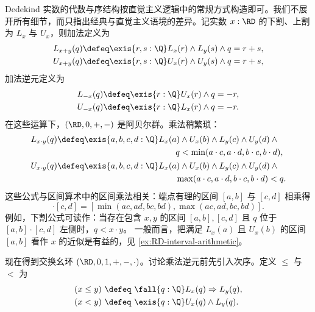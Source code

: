 Dedekind 实数的代数与序结构按直觉主义逻辑中的常规方式构造即可。我们不展开所有细节，而只指出经典与直觉主义语境的差异。记实数 $x : \RD$ 的下割、上割为 $L_x$ 与 $U_x$，则加法定义为%
%
%
\begin{align*}
  L_{x + y}(q) &\defeq \exis{r, s : \Q} L_x(r) \land L_y(s) \land q = r + s, \\
  U_{x + y}(q) &\defeq \exis{r, s : \Q} U_x(r) \land U_y(s) \land q = r + s,
\end{align*}
%
加法逆元定义为
%
\begin{align*}
  L_{-x}(q) &\defeq \exis{r : \Q} U_x(r) \land q = - r, \\
  U_{-x}(q) &\defeq \exis{r : \Q} L_x(r) \land q = - r.
\end{align*}
%
在这些运算下，$(\RD, 0, {+}, {-})$ 是阿贝尔群。乘法稍繁琐：
%
%
\begin{align*}
  L_{x \cdot y}(q) &\defeq
  \begin{aligned}[t]
    \exis{a, b, c, d : \Q} & L_x(a) \land U_x(b) \land L_y(c) \land U_y(d) \land {}\\
                           & \qquad q < \min (a \cdot c, a \cdot d, b \cdot c, b \cdot d),
  \end{aligned} \\
  U_{x \cdot y}(q) &\defeq
  \begin{aligned}[t]
    \exis{a, b, c, d : \Q} & L_x(a) \land U_x(b) \land L_y(c) \land U_y(d) \land {}\\
                           & \qquad \max (a \cdot c, a \cdot d, b \cdot c, b \cdot d) < q.
  \end{aligned}
\end{align*}
%
%
这些公式与区间算术中的区间乘法相关：端点有理的区间 $[a,b]$ 与 $[c,d]$ 相乘得
%
\begin{equation*}
  [a,b] \cdot [c,d] =
  [\min(a c, a d, b c, b d), \max(a c, a d, b c, b d)].
\end{equation*}
%
例如，下割公式可读作：当存在包含 $x,y$ 的区间 $[a,b],[c,d]$ 且 $q$ 位于 $[a,b] \cdot [c,d]$ 左侧时，$q < x \cdot y$。
一般而言，把满足 $L_x(a)$ 且 $U_x(b)$ 的区间 $[a,b]$ 看作 $x$ 的近似是有益的，见
\cref{ex:RD-interval-arithmetic}。

现在得到交换幺环
%
$(\RD, 0, 1, {+}, {-}, {\cdot})$。讨论乘法逆元前先引入次序。定义 $\leq$ 与 $<$ 为
%
\begin{align*}
  (x \leq y) &\ \defeq \ \fall{q : \Q} L_x(q) \Rightarrow L_y(q), \\
  (x < y)    &\ \defeq \ \exis{q : \Q} U_x(q) \land L_y(q).
\end{align*}

